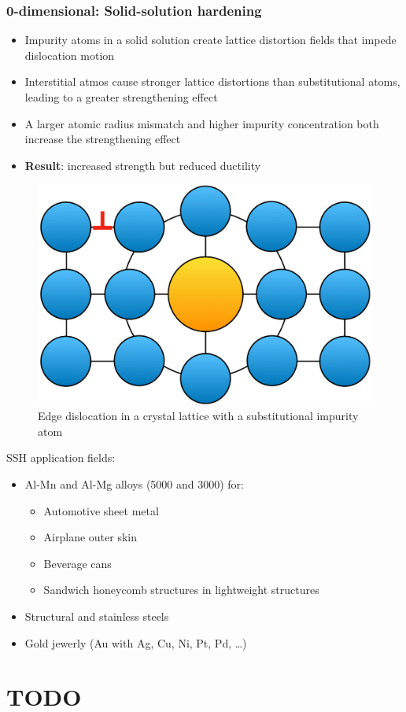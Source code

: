 \documentclass{article}
\begin{document}
\subsubsection{0-dimensional: Solid-solution hardening}
\begin{itemize}
  \item Impurity atoms in a solid solution create lattice distortion fields that impede dislocation motion
  \item Interstitial atmos cause stronger lattice distortions than substitutional atoms, leading to a greater strengthening effect
  \item A larger atomic radius mismatch and higher impurity concentration both increase the strengthening effect
  \item \textbf{Result}: increased strength but reduced ductility
\end{itemize}

\begin{figure}[ht!]
  \centering
  \includegraphics[width=.4\textwidth]{media/0d_strength.png}
  \caption*{Edge dislocation in a crystal lattice with a substitutional impurity atom}
\end{figure}

\newpage
SSH application fields:
\begin{itemize}
  \item Al-Mn and Al-Mg alloys (5000 and 3000) for:
  \begin{itemize}
    \item Automotive sheet metal
    \item Airplane outer skin
    \item Beverage cans
    \item Sandwich honeycomb structures in lightweight structures
  \end{itemize}
  \item Structural and stainless steels
  \item Gold jewerly (Au with Ag, Cu, Ni, Pt, Pd, \dots)
\end{itemize}

\section{\color{red}TODO}
\end{document}
